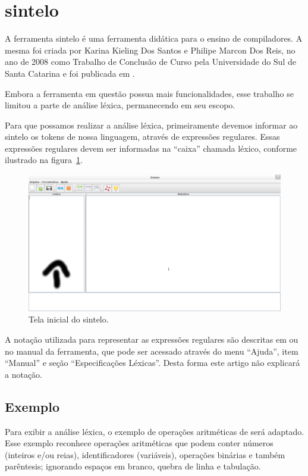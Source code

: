 \section{sintelo} %
\label{sec:sintelo}
A ferramenta sintelo é uma ferramenta didática para o ensino de compiladores. A mesma foi criada por Karina Kieling Dos Santos e Philipe Marcon Dos Reis, no ano de 2008 como Trabalho de Conclusão de Curso pela Universidade
do Sul de Santa Catarina e foi publicada em \cite{sintelo}. 

Embora a ferramenta em questão possua mais funcionalidades, esse trabalho se limitou a parte de análise léxica, permanecendo em seu escopo.

Para que possamos realizar a análise léxica, primeiramente devemos informar ao sintelo os tokens de nossa linguagem, através de expressões regulares. Essas expressões regulares devem ser informadas na ``caixa'' chamada léxico, conforme ilustrado na figura~\ref{sintelo-inicial}.

\begin{figure}[ht!]
	\centering
	\includegraphics[scale=0.28]{imgs/sintelo-inicial-ed}
	\caption{Tela inicial do sintelo.}
	\label{sintelo-inicial}
\end{figure}

A notação utilizada para representar as expressões regulares são descritas em \cite{sintelo} ou no manual da ferramenta, que pode ser acessado através do menu ``Ajuda'', item ``Manual'' e seção ``Especificações Léxicas''. Desta forma este artigo não explicará a notação.

\subsection{Exemplo} %
\label{sub:exemplo}
Para exibir a análise léxica, o exemplo de operações aritméticas de \cite{Sebesta201201} será adaptado. Esse exemplo reconhece operações aritméticas que podem conter números (inteiros e/ou reias), identificadores (variáveis), operações binárias e também parêntesis; ignorando espaços em branco, quebra de linha e tabulação.

